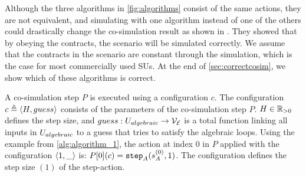 Although the three algorithms in \cref{fig:algorithms} consist of the same actions, they are not equivalent, and simulating with one algorithm instead of one of the others could drastically change the co-simulation result as shown in \cite{Gomes2019c}. 
They showed that by obeying the contracts, the scenario will be simulated correctly. We assume that the contracts in the scenario are constant through the simulation, which is the case for most commercially used SUs.
At the end of \cref{sec:correctcosim}, we show which of these algorithms is correct.

A co-simulation step $P$ is executed using a configuration $c$. The configuration $c \triangleq  \left\langle H, guess \right\rangle $ consists of the parameters of the co-simulation step $P$.  $H \in \mathbb{R}_{> 0}$ defines the step size, and $guess : U_{algebraic} \to \mathcal{V_{E}}$ is a total function linking all inputs in $U_{algebraic}$ to a guess that tries to satisfy the algebraic loops. Using the example from \cref{alg:algorithm_1}, the action at index 0 in $P$ applied with the configuration $ \left\langle 1,\_ \right\rangle $ is: $P[0](c) = \mathtt{step}_{A}(s_{A}^{(0)}, 1)$. The configuration defines the step size $(1)$ of the step-action. 

